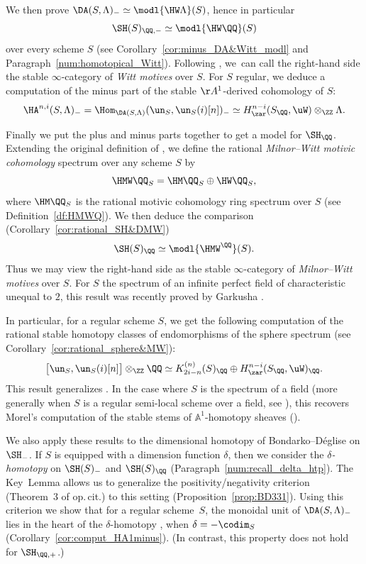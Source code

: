 We then prove $\DA(S, \Lambda)_- \simeq \modl{\HW \Lambda}(S)$, hence in particular
\[
\SH(S)_{\QQ,-} \simeq \modl{\HW \QQ}(S)
\]
over every scheme $S$ (see Corollary~\ref{cor:minus_DA&Witt_modl} and Paragraph~\ref{num:homotopical_Witt}).
Following \cite{ALP}, we~can call the right-hand side the stable $\infty$-category of \emph{Witt motives} over $S$.
For $S$ regular, we deduce a computation of the minus part of the stable $\AA^1$-derived cohomology of $S$:
\[
\HA^{n,i}(S,\Lambda)_-
= \Hom_{\DA(S,\Lambda)}(\un_S,\un_S(i)[n])_- \simeq H^{n-i}_\zar(S_\QQ,\uW) \otimes_\ZZ \Lambda.
\]

Finally we put the plus and minus parts together to get a model for $\SH_\QQ$.
Extending the original definition of \cite[Chap.\,6]{BCDFO}, we define the rational \emph{Milnor--Witt motivic cohomology} spectrum over any scheme $S$ by
\[
\HMW \QQ_S=\HM \QQ_S \oplus \HW \QQ_S,
\]
where $\HM \QQ_S$ is the rational motivic cohomology ring spectrum over $S$ (see Definition~\ref{df:HMWQ}).
We then deduce the comparison (Corollary~\ref{cor:rational_SH&DMW})
\[
\SH(S)_{\QQ} \simeq \modl{\HMW^\QQ}(S).
\]
Thus we may view the right-hand side as the stable $\infty$-category of \emph{Milnor--Witt motives} over $S$.
For $S$ the spectrum of an infinite perfect field of characteristic unequal to $2$, this result was recently proved by Garkusha \cite{Garkusha}.

In particular, for a regular scheme $S$, we get the following computation
of the ratio\-nal stable homotopy classes of endomorphisms of the sphere spectrum (see Corollary~\ref{cor:rational_sphere&MW}):
\[
\big[\un_S,\un_S(i)[n]\big] \otimes_\ZZ \QQ \simeq K_{2i-n}^{(n)}(S)_\QQ \oplus H^{n-i}_\zar(S_\QQ,\uW)_\QQ.
\]
This result generalizes \cite[Rem.\,4.5]{ALP}. In the case where $S$ is the spectrum of a field (more generally when $S$ is a regular semi-local scheme over a field, see \cite[Th.\,10.12]{BachmannHoyois}), this recovers Morel's computation of the stable stems of $\mathbb{A}^1$-homotopy sheaves (\cite[Th.\,6.40]{MorelA1}).

We also apply these results to the dimensional homotopy \tstructures of Bondarko--Déglise \cite{BD1} on $\SH_-$.
If $S$ is equipped with a dimension function $\delta$, then we consider the \emph{$\delta$-homotopy \tstructure} on $\SH(S)_-$ and $\SH(S)_\QQ$ (Paragraph~\ref{num:recall_delta_htp}).
The Key~Lemma allows us to generalize the positivity/negativity criterion (Theorem~3 of op.\,cit.) to this setting (Proposition~\ref{prop:BD331}).
Using this criterion we show that for a regular scheme~$S$, the monoidal unit of $\DA(S,\Lambda)_-$ lies in the heart of the $\delta$-homotopy \tstructure, when $\delta=-\codim_S$ (Corollary~\ref{cor:comput_HA1minus}).
(In contrast, this property does not hold for $\SH_{\QQ,+}$.)

